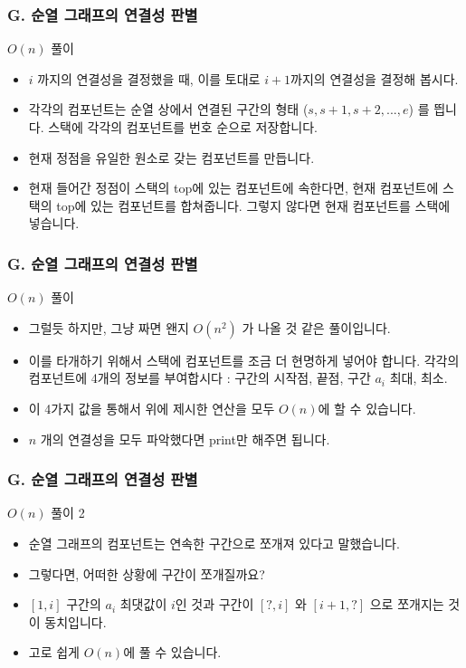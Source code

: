 \documentclass{beamer}
\begin{document}
\begin{frame}
	\frametitle{G. 순열 그래프의 연결성 판별}
	\begin{block}{$O(n)$ 풀이}
		\begin{itemize}
			\item $i$ 까지의 연결성을 결정했을 때, 이를 토대로 $i+1$까지의 연결성을 결정해 봅시다.
			\item 각각의 컴포넌트는 순열 상에서 연결된 구간의 형태 ($s, s+1, s+2, ..., e$) 를 띕니다. 스택에 각각의 컴포넌트를 번호 순으로 저장합니다.
			\item 현재 정점을 유일한 원소로 갖는 컴포넌트를 만듭니다. 
			\item 현재 들어간 정점이 스택의 top에 있는 컴포넌트에 속한다면, 현재 컴포넌트에 스택의 top에 있는 컴포넌트를 합쳐줍니다. 그렇지 않다면 현재 컴포넌트를 스택에 넣습니다.  
		\end{itemize}
	\end{block}
\end{frame}

\begin{frame}
	\frametitle{G. 순열 그래프의 연결성 판별}
	\begin{block}{$O(n)$ 풀이}
		\begin{itemize}
			\item 그럴듯 하지만, 그냥 짜면 왠지 $O(n^2)$ 가 나올 것 같은 풀이입니다.
			\item 이를 타개하기 위해서 스택에 컴포넌트를 조금 더 현명하게 넣어야 합니다. 각각의 컴포넌트에 4개의 정보를 부여합시다 : 구간의 시작점, 끝점, 구간 $a_i$ 최대, 최소.
			\item 이 4가지 값을 통해서 위에 제시한 연산을 모두 $O(n)$에 할 수 있습니다. 
			\item $n$ 개의 연결성을 모두 파악했다면 print만 해주면 됩니다.
		\end{itemize}
	\end{block}
\end{frame}

\begin{frame}
	\frametitle{G. 순열 그래프의 연결성 판별}
	\begin{block}{$O(n)$ 풀이 2}
		\begin{itemize}
			\item 순열 그래프의 컴포넌트는 연속한 구간으로 쪼개져 있다고 말했습니다.
			\item 그렇다면, 어떠한 상황에 구간이 쪼개질까요?
			\item $[1, i]$ 구간의 $a_i$ 최댓값이 $i$인 것과 구간이 $[?, i]$ 와 $[i+1, ?]$ 으로 쪼개지는 것이 동치입니다.
			\item 고로 쉽게 $O(n)$에 풀 수 있습니다. 
		\end{itemize}
	\end{block}
\end{frame}
\end{document}
